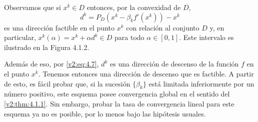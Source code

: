 Observamos que si $x^k \in D$ entonces, por la convexidad de $D$,
\[
    d^k = P_D(x^k - \beta_k f'(x^k)) - x^k
\]
es una dirección factible en el punto $x^k$ con relación al conjunto $D$ y, en particular, $x^k(\alpha) = x^k + \alpha d^k \in D$ para todo $\alpha \in [0, 1]$. Este intervalo es ilustrado en la Figura 4.1.2.


Además de eso, por \eqref{v2:eq:4.7}, $d^k$ es una dirección de descenso de la función $f$ en el punto $x^k$. Tenemos entonces una dirección de descenso que es factible. A partir de esto, es fácil probar que, si la sucesión $\{\beta_k\}$ está limitada inferiormente por un número positivo, este esquema posee convergencia global en el sentido del \cref{v2:thm:4.1.1}. Sin embargo, probar la tasa de convergencia lineal para este esquema ya no es posible, por lo menos bajo las hipótesis usuales.

